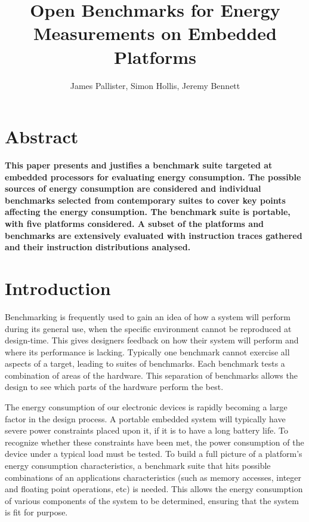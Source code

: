 \documentclass[twocolumn]{article}
\title{\bfseries\fontsize{22}{1}\selectfont Open Benchmarks for Energy Measurements on Embedded Platforms}
\author{James Pallister, Simon Hollis, Jeremy Bennett}
\begin{document}
\maketitle
\section{Abstract}

\textbf{This paper presents and justifies a benchmark suite targeted at embedded processors for evaluating energy consumption. The possible sources of energy consumption are considered and individual benchmarks selected from contemporary suites to cover key points affecting the energy consumption. The benchmark suite is portable, with five platforms considered. A subset of the platforms and benchmarks are extensively evaluated with instruction traces gathered and their instruction distributions analysed.}

\section{Introduction}

Benchmarking is frequently used to gain an idea of how a system will perform during its general use, when the specific environment cannot be reproduced at design-time. This gives designers feedback on how their system will perform and where its performance is lacking. Typically one benchmark cannot exercise all aspects of a target, leading to suites of benchmarks. Each benchmark tests a combination of areas of the hardware. This separation of benchmarks allows the design to see which parts of the hardware perform the best.

The energy consumption of our electronic devices is rapidly becoming a large factor in the design process. A portable embedded system will typically have severe power constraints placed upon it, if it is to have a long battery life. To recognize whether these constraints have been met, the power consumption of the device under a typical load must be tested. To build a full picture of a platform’s energy consumption characteristics, a benchmark suite that hits possible combinations of an applications characteristics (such as memory accesses, integer and floating point operations, etc) is needed. This allows the energy consumption of various components of the system to be determined, ensuring that the system is fit for purpose.
\end{document}
